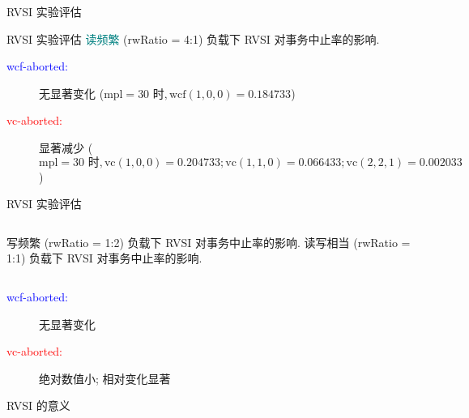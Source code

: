 \begin{frame}{RVSI 实验评估}
  
\end{frame}
\begin{frame}{RVSI 实验评估}
  {\textcolor{teal}{读频繁} (rwRatio = 4:1) 负载下 RVSI 对事务中止率的影响.}

	\pause
  \begin{description}
	\item[\textcolor{blue}{wcf-aborted:}] 无显著变化 {\small ($\text{mpl} = 30\text{ 时}, \text{wcf}(1,0,0) = 0.184733$)}
	  \pause
	\item[\textcolor{red}{vc-aborted:}] 显著减少 {\small ($\text{mpl} = 30 \text{ 时}, 
	  \text{vc}(1,0,0) = 0.204733; \text{vc}(1,1,0) = 0.066433; \text{vc}(2,2,1) = 0.002033$)}
  \end{description}
\end{frame}
\begin{frame}{RVSI 实验评估}
  \begin{columns}
		{写频繁 (rwRatio = 1:2) 负载下 RVSI 对事务中止率的影响.}
		{读写相当 (rwRatio = 1:1) 负载下 RVSI 对事务中止率的影响.}
  \end{columns}

  \begin{description}
	\item[\textcolor{blue}{wcf-aborted:}] 无显著变化
	\item[\textcolor{red}{vc-aborted:}] 绝对数值小; 相对变化显著 
  \end{description}
\end{frame}
\begin{frame}{RVSI 的意义}
\end{frame}
